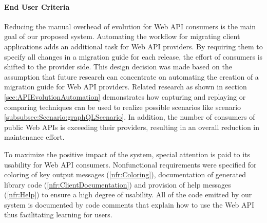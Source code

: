 \paragraph{End User Criteria}
Reducing the manual overhead of evolution for Web API consumers is the main goal of our proposed system. Automating the workflow for migrating client applications adds an additional task for Web API providers. By requiring them to specify all changes in a migration guide for each release, the effort of consumers is shifted to the provider side. This design decision was made based on the assumption that future research can concentrate on automating the creation of a migration guide for Web API providers. Related research as shown in section \ref{sec:APIEvolutionAutomation} demonstrates how capturing and replaying or comparing techniques can be used to realize possible scenarios like scenario \ref{subsubsec:Scenario:graphQLScenario}. In addition, the number of consumers of public Web APIs is exceeding their providers, resulting in an overall reduction in maintenance effort. 

To maximize the positive impact of the system, special attention is paid to its usability for Web API consumers. Nonfunctional requirements were specified for coloring of key output messages (\ref{nfr:Coloring}), documentation of generated library code (\ref{nfr:ClientDocumentation}) and provision of help messages (\ref{nfr:Help}) to ensure a high degree of usability. All of the code emitted by our system is documented by code comments that explain how to use the Web API thus facilitating learning for users.